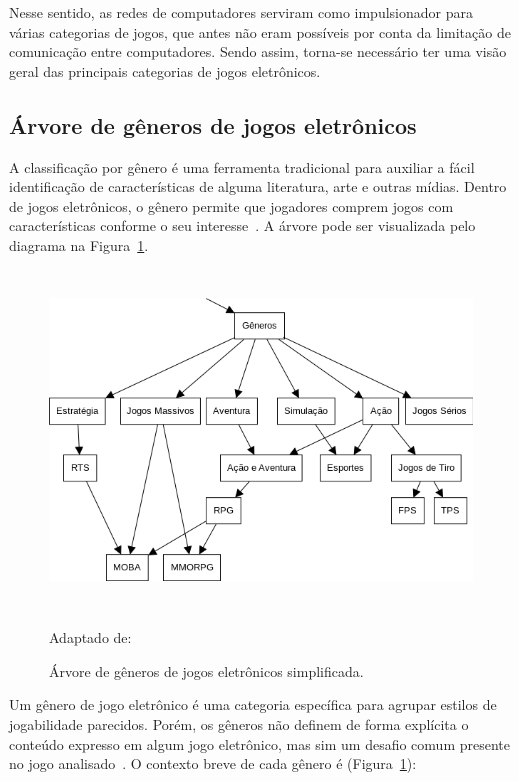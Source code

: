 Nesse sentido, as redes de computadores serviram como impulsionador para várias categorias de jogos, que antes não eram possíveis por conta da limitação de comunicação entre computadores.
%
Sendo assim, torna-se necessário ter uma visão geral das principais categorias de jogos eletrônicos.



\subsection{Árvore de gêneros de jogos eletrônicos}
\label{sec:arvore_generos}


A classificação por gênero é uma ferramenta tradicional para auxiliar a fácil identificação de características de alguma literatura, arte e outras mídias.
%
Dentro de jogos eletrônicos, o gênero permite que jogadores comprem jogos com características conforme o seu interesse~\cite{Clarke2015}.
%
A árvore pode ser visualizada pelo diagrama na Figura~\ref{fig:generos}.


\begin{figure}[htb!]
\caption{Árvore de gêneros de jogos eletrônicos simplificada.}
\label{fig:generos}
\includegraphics[height=9cm]{img/cap2/generos.png}
\centering

Adaptado de:~\cite{adams_1208533}
\end{figure}



Um gênero de jogo eletrônico é uma categoria específica para agrupar estilos de jogabilidade parecidos.
%
Porém, os gêneros não definem de forma explícita o conteúdo expresso em algum jogo eletrônico, mas sim um desafio comum presente no jogo analisado~\cite{adams_1208533, video_game_technologies}.
%
O contexto breve de cada gênero é (Figura~\ref{fig:generos}):



